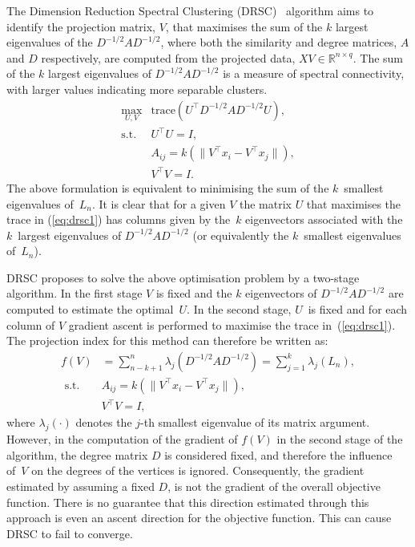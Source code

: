 \documentclass{book}
\def\R{\mathbb{R}}
\begin{document}
The Dimension Reduction Spectral Clustering (DRSC)~\cite{NiuDJ2011} algorithm
aims to identify the projection matrix, $V$, that maximises
the sum of the $k$ largest eigenvalues of the $D^{-1/2}AD^{-1/2}$,
where both the similarity and degree matrices, $A$ and $D$ respectively,
are computed from the projected data, $XV \in \R^{n \times q}$.
%
The sum of the $k$ largest eigenvalues of $D^{-1/2}AD^{-1/2}$ is a measure of
spectral connectivity, with larger values indicating more separable clusters.
%
%
\begin{eqnarray}
%
\max_{U, V} &  \mbox{trace}(U^\top D^{-1/2}AD^{-1/2}U), \label{eq:drsc1}\\
%	
\mathrm{s.t.} & U^\top U = I,\\
%
& A_{ij} = k(\|V^\top x_i - V^\top x_j \|), \label{eq:Aij}\\
%
&V^\top V = I.
%
\end{eqnarray}
%
%
The above formulation is equivalent to minimising the sum of the 
$k$~smallest eigenvalues of~$L_n$.
%
It is clear that
for a given $V$ the matrix $U$ that maximises the trace in (\ref{eq:drsc1}) has
columns given by the~$k$ eigenvectors associated with the $k$~largest
eigenvalues of $D^{-1/2}AD^{-1/2}$ (or equivalently the $k$~smallest
eigenvalues of~$L_n$).

DRSC proposes to solve the above optimisation problem by a two-stage algorithm.
In the first stage $V$ is fixed and the $k$ eigenvectors of $D^{-1/2}AD^{-1/2}$
are computed to estimate the optimal~$U$. In the second stage, $U$~is fixed and
for each column of $V$ gradient ascent is performed to maximise the trace
in~(\ref{eq:drsc1}). The projection index for this method can therefore be written as:
%
\begin{align*}
%
f(V) & = \sum^n_{n-k+1} \lambda_j \left( D^{-1/2}AD^{-1/2} \right) = \sum_{j=1}^k \lambda_j \left( L_n \right),\\
%
\textrm{ s.t. } & A_{ij} = k(\|V^\top x_i - V^\top x_j \|),\\
%
 & V^\top V = I,
\end{align*}
%
where $\lambda_j(\cdot)$ denotes the $j$-th smallest eigenvalue of 
its matrix argument.
%
However, in the computation of the gradient of $f(V)$ in the second stage of
the algorithm, the degree matrix $D$ is considered fixed, and therefore the
influence of~$V$ on the degrees of the vertices is ignored. Consequently, the
gradient estimated by assuming a fixed $D$, is not the gradient of the overall
objective function. There is no guarantee that this direction estimated through
this approach is even an ascent direction for the objective function. This can
cause DRSC to fail to converge.
\end{document}
